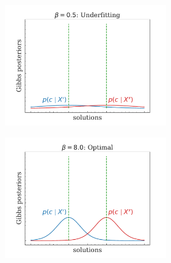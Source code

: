 \begin{frame}
	\begin{figure}[H]
		\centering
		\begin{subfigure}[b]{0.9\textwidth}
			\begin{subfigure}[b]{0.3\textwidth}
				\centering
				\includegraphics[width=\textwidth]{img/theoretical_background/method_beta=0.5.pdf}
			\end{subfigure}
			\hfill
			\begin{subfigure}[b]{0.3\textwidth}
				\centering
				\includegraphics[width=\textwidth]{img/theoretical_background/method_beta=8.0.pdf}
			\end{subfigure}
			\hfill
			\begin{subfigure}[b]{0.3\textwidth}

\end{subfigure}
\end{subfigure}
\end{figure}
\end{frame}
